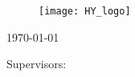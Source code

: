 \begin{titlepage}{
    \centering
    \begin{figure}[t]
        \centering
        \texttt{[image: HY\_logo]}
    \end{figure}
    
    \mythesis \par
    \mysubject \par
    \mySpecSubject \par
    
    \bigskip
    \MakeUppercase{\mytitle}
    
    \bigskip
    \myname
    
    \mydate\today
    
    \vfill
    
    Supervisors: \par
    \mysupervisors \par
    \bigskip
    \bigskip
    \MakeUppercase{\myuni} \par
    \MakeUppercase{\myfaculty} \par
    \MakeUppercase{\mydept} \par
    \MakeUppercase{\mysubject} \par
    \addressFirst \par
    \addressSecond \par
}
\end{titlepage}